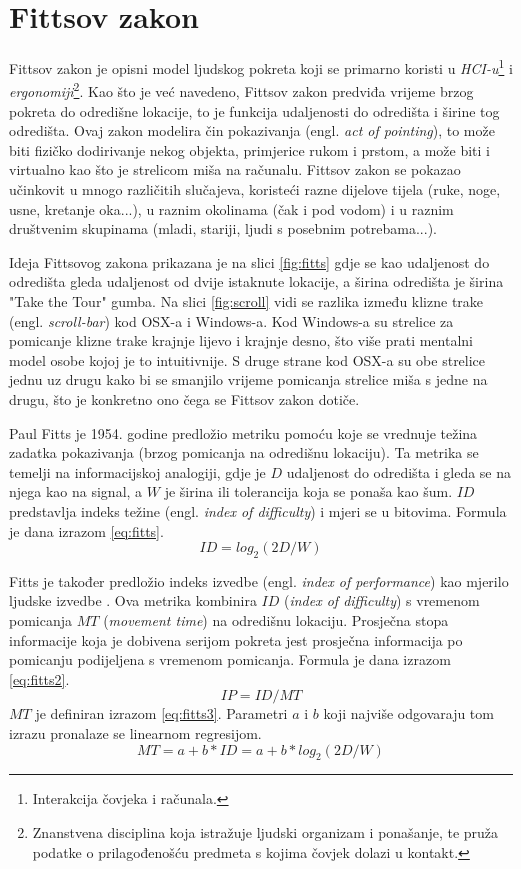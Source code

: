 \documentclass[times, utf8, zavrsni]{fer}
\begin{document}
\section{Fittsov zakon}
\label{sec:fitts}
Fittsov zakon je opisni model ljudskog pokreta koji se primarno koristi u \emph{HCI-u}\footnote{Interakcija čovjeka i računala.} i \emph{ergonomiji}\footnote{Znanstvena disciplina koja istražuje ljudski organizam i ponašanje, te pruža podatke o prilagođenošću predmeta s kojima čovjek dolazi u kontakt.}. Kao što je već navedeno, Fittsov zakon predviđa vrijeme brzog pokreta do odredišne lokacije, to je funkcija udaljenosti do odredišta i širine tog odredišta. Ovaj zakon modelira čin pokazivanja (engl. \emph{act of pointing}), to može biti fizičko dodirivanje nekog objekta, primjerice rukom i prstom, a može biti i virtualno kao što je strelicom miša na računalu. Fittsov zakon se pokazao učinkovit u mnogo različitih slučajeva, koristeći razne dijelove tijela (ruke, noge, usne, kretanje oka...), u raznim okolinama (čak i pod vodom) i u raznim društvenim skupinama (mladi, stariji, ljudi s posebnim potrebama...). 

Ideja Fittsovog zakona prikazana je na slici \ref{fig:fitts} gdje se kao udaljenost do odredišta gleda udaljenost od dvije istaknute lokacije, a širina odredišta je širina "Take the Tour" gumba. Na slici \ref{fig:scroll} vidi se razlika između klizne trake (engl. \emph{scroll-bar}) kod OSX-a i Windows-a. Kod Windows-a su strelice za pomicanje klizne trake krajnje lijevo i krajnje desno, što više prati mentalni model osobe kojoj je to intuitivnije. S druge strane kod OSX-a su obe strelice jednu uz drugu kako bi se smanjilo vrijeme pomicanja strelice miša s jedne na drugu, što je konkretno ono čega se Fittsov zakon dotiče.

Paul Fitts je 1954. godine predložio metriku pomoću koje se vrednuje težina zadatka pokazivanja (brzog pomicanja na odredišnu lokaciju). Ta metrika se temelji na informacijskoj analogiji, gdje je $D$ udaljenost do odredišta i gleda se na njega kao na signal, a $W$ je širina ili tolerancija koja se ponaša kao šum. $ID$ predstavlja indeks težine (engl. \emph{index of difficulty}) i mjeri se u bitovima. Formula je dana izrazom \ref{eq:fitts}.
\begin{equation}
\label{eq:fitts}
ID = log_2(2D/W)
\end{equation}

Fitts je također predložio indeks izvedbe (engl. \emph{index of performance}) kao mjerilo ljudske izvedbe . Ova metrika kombinira $ID$ (\emph{index of difficulty}) s vremenom pomicanja $MT$ (\emph{movement time}) na odredišnu lokaciju. Prosječna stopa informacije koja je dobivena serijom pokreta jest prosječna informacija po pomicanju podijeljena s vremenom pomicanja. Formula je dana izrazom \ref{eq:fitts2}.
\begin{equation}
\label{eq:fitts2}
IP = ID/MT
\end{equation}
$MT$ je definiran izrazom \ref{eq:fitts3}. Parametri $a$ i $b$ koji najviše odgovaraju tom izrazu pronalaze se linearnom regresijom.
\begin{equation}
\label{eq:fitts3}
MT = a+b*ID = a+b*log_2(2D/W)
\end{equation}
\end{document}
